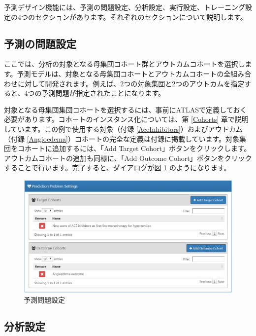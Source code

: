 \documentclass[
  11pt]{book}
\theoremstyle{definition}
\theoremstyle{definition}
\theoremstyle{definition}
\theoremstyle{definition}
\theoremstyle{remark}
\begin{document}
予測デザイン機能には、予測の問題設定、分析設定、実行設定、トレーニング設定の4つのセクションがあります。それぞれのセクションについて説明します。

\subsection{予測の問題設定}\label{ux4e88ux6e2cux306eux554fux984cux8a2dux5b9a}

ここでは、分析の対象となる母集団コホート群とアウトカムコホートを選択します。予測モデルは、対象となる母集団コホートとアウトカムコホートの全組み合わせに対して開発されます。例えば、2つの対象集団と2つのアウトカムを指定すると、4つの予測問題が指定されたことになります。

対象となる母集団集団コホートを選択するには、事前にATLASで定義しておく必要があります。コホートのインスタンス化については、第 \ref{Cohorts} 章で説明しています。この例で使用する対象（付録 \ref{AceInhibitors}）およびアウトカム（付録 \ref{Angioedema}）コホートの完全な定義は付録に掲載しています。対象集団をコホートに追加するには、「Add Target Cohort」ボタンをクリックします。アウトカムコホートの追加も同様に、「Add Outcome Cohort」ボタンをクリックすることで行います。完了すると、ダイアログが図 \ref{fig:problemSettings} のようになります。

\begin{figure}

{\centering \includegraphics[width=1\linewidth]{images/PatientLevelPrediction/problemSettings} 

}

\caption{予測問題設定}\label{fig:problemSettings}
\end{figure}

\subsection{分析設定}\label{ux5206ux6790ux8a2dux5b9a}
\end{document}
